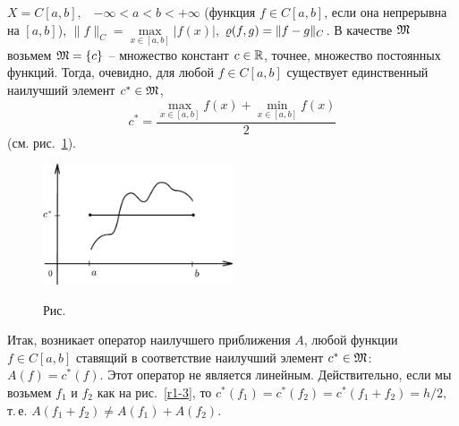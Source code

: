 \begin{Example}
$X=C[a,b],$~ $-\infty < a < b < +\infty$ {(функция $f\in
C[a,b]$,} {если она непрерывна на $[a,b]$)},
{$\|f\|_C=\max\limits_{x\in[a,b]}|f(x)|$,}
$\varrho(f,g)=\|f-g\|_C$. В качестве $\mathfrak{M}$ возьмем $\mathfrak{M}=\{c \}$
{--} множество констант $c \in \mathbb{R}${, точнее, множество}
{постоянных функций}. Тогда, очевидно, {для любой} $ f
\in C[a,b]$ существует единственный наилучший элемент $c^* \in
\mathfrak{M}$, {
$$
c^* = \frac{\max\limits_{x\in[a,b]}{f(x)}+\min\limits_{x\in[a,b]} {f(x)}}{2}
$$
}
(см. рис.~\ref{r1-2}).
\end{Example}


\begin{figure}[ht]
\begin{center}
\includegraphics[width=0.5\textwidth]{pict/pict01-2.eps}
\end{center}
 \bigskip
 \label{r1-2}

 \centerline{Рис.~\theris}
 \bigskip
\end{figure}






Итак, возникает оператор {наилучшего приближения} $A${,}
любой функции $f \in C[a,b]$ ставящий в соответствие
наилучший элемент $c^* \in \mathfrak{M}$: $A(f)=c^*(f).$ Этот оператор не является линейным.
Действительно, если мы возьмем $f_1$ и $f_2$ как на рис.~\ref{r1-3}, то
$c^*(f_1)=c^*(f_2)=c^*(f_1+f_2)=h/2,$ т.\,е. $A(f_1+f_2)\ne A(f_1)+A(f_2).$


